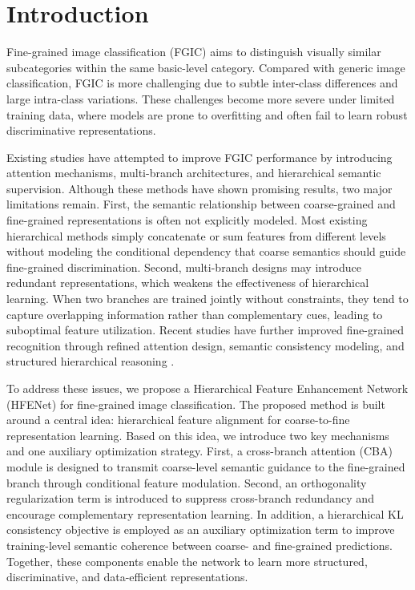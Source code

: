 \documentclass[pdflatex,iicol,sn-mathphys-num]{sn-jnl}
\theoremstyle{thmstyleone}%
\theoremstyle{thmstyletwo}%
\theoremstyle{thmstylethree}%
\begin{document}
\maketitle

\section{Introduction}
\label{sec:introduction}

Fine-grained image classification (FGIC) aims to distinguish visually similar subcategories within the same basic-level category. 
Compared with generic image classification, FGIC is more challenging due to subtle inter-class differences and large intra-class variations. 
These challenges become more severe under limited training data, where models are prone to overfitting and often fail to learn robust discriminative representations.

Existing studies have attempted to improve FGIC performance by introducing attention mechanisms, multi-branch architectures, and hierarchical semantic supervision. 
Although these methods have shown promising results, two major limitations remain. 
First, the semantic relationship between coarse-grained and fine-grained representations is often not explicitly modeled. 
Most existing hierarchical methods simply concatenate or sum features from different levels without modeling the conditional dependency that coarse semantics should guide fine-grained discrimination. 
Second, multi-branch designs may introduce redundant representations, which weakens the effectiveness of hierarchical learning. 
When two branches are trained jointly without constraints, they tend to capture overlapping information rather than complementary cues, leading to suboptimal feature utilization.
Recent studies have further improved fine-grained recognition through refined attention design, semantic consistency modeling, and structured hierarchical reasoning \cite{wang2025crasmra,wang2025cfgvc,gao2025chbc}.

To address these issues, we propose a Hierarchical Feature Enhancement Network (HFENet) for fine-grained image classification. 
The proposed method is built around a central idea: hierarchical feature alignment for coarse-to-fine representation learning. 
Based on this idea, we introduce two key mechanisms and one auxiliary optimization strategy. 
First, a cross-branch attention (CBA) module is designed to transmit coarse-level semantic guidance to the fine-grained branch through conditional feature modulation. 
Second, an orthogonality regularization term is introduced to suppress cross-branch redundancy and encourage complementary representation learning. 
In addition, a hierarchical KL consistency objective is employed as an auxiliary optimization term to improve training-level semantic coherence between coarse- and fine-grained predictions. 
Together, these components enable the network to learn more structured, discriminative, and data-efficient representations.
\end{document}
